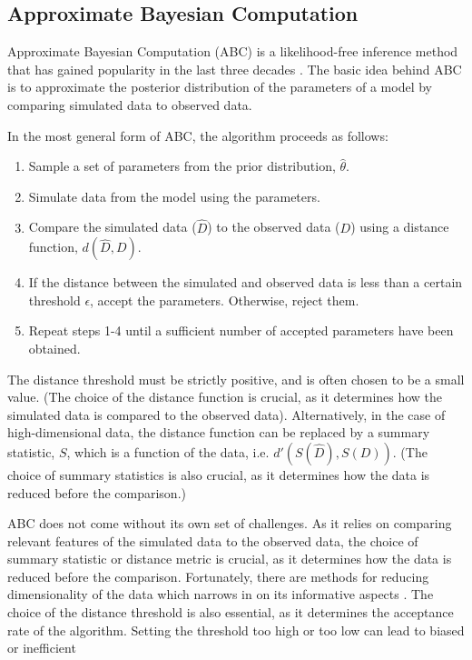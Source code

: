 \subsection{Approximate Bayesian Computation}
Approximate Bayesian Computation (ABC) is a likelihood-free inference method that has gained popularity in the
last three decades \cite{tavare_inferring_1997, lechevallier_integrating_2010, jagiella_parallelization_2017}.
The basic idea behind ABC is to approximate the posterior distribution of the parameters of a model by comparing
simulated data to observed data. \par
In the most general form of ABC, the algorithm proceeds as follows:
\begin{enumerate}
    \item Sample a set of parameters from the prior distribution, $\hat\theta$.
    \item Simulate data from the model using the parameters.
    \item Compare the simulated data ($\hat D$) to the observed data ($D$) using a distance function, $d(\hat D, D)$.
    \item If the distance between the simulated and observed data is less than a certain threshold $\epsilon$, accept the
    parameters. Otherwise, reject them.
    \item Repeat steps 1-4 until a sufficient number of accepted parameters have been obtained.
\end{enumerate}
The distance threshold must be strictly positive, and is often chosen to be a small value. (The choice of the distance
function is crucial, as it determines how the simulated data is compared to the observed data). Alternatively, in the
case of high-dimensional data, the distance function can be replaced by a summary statistic, $S$, which is a function of the
data, i.e. $d'(S(\hat D), S(D))$. (The choice of summary statistics is also crucial, as it determines how the data is
reduced before the comparison.) \par
ABC does not come without its own set of challenges. As it relies on comparing relevant features of the simulated data to
the observed data, the choice of summary statistic or distance metric is crucial, as it determines how the data is
reduced before the comparison. Fortunately, there are methods for reducing dimensionality of the data which
narrows in on its informative aspects \cite{blum_comparative_2013}.
The choice of the distance threshold is also essential, as it determines
the acceptance rate of the algorithm. Setting the threshold too high or too low can lead to biased or inefficient
